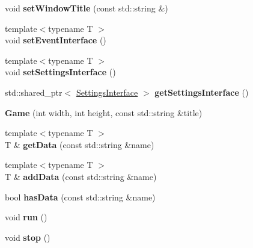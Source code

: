 \begin{DoxyCompactItemize}
void {\bfseries set\+Window\+Title} (const std\+::string \&)
\item 
\mbox{\label{classbkengine_1_1Game_a1480bc58570c9fa4696a642ebe441d7e}} 
{\footnotesize template$<$typename T $>$ }\\void {\bfseries set\+Event\+Interface} ()
\item 
\mbox{\label{classbkengine_1_1Game_a4c86f004e97fe295c87ea2d756cf9793}} 
{\footnotesize template$<$typename T $>$ }\\void {\bfseries set\+Settings\+Interface} ()
\item 
\mbox{\label{classbkengine_1_1Game_a03800577e8e89c0370a6e29d62c5bacf}} 
std\+::shared\+\_\+ptr$<$ \hyperlink{classbkengine_1_1SettingsInterface}{Settings\+Interface} $>$ {\bfseries get\+Settings\+Interface} ()
\item 
\mbox{\label{classbkengine_1_1Game_a91cbdf7dd5a500e2f3fe44cfc5c9b7ba}} 
{\bfseries Game} (int width, int height, const std\+::string \&title)
\item 
\mbox{\label{classbkengine_1_1Game_af69eb7d8cc53c238a87d290841951525}} 
{\footnotesize template$<$typename T $>$ }\\T \& {\bfseries get\+Data} (const std\+::string \&name)
\item 
\mbox{\label{classbkengine_1_1Game_ac9f317fa3194c88239b86a514908bf11}} 
{\footnotesize template$<$typename T $>$ }\\T \& {\bfseries add\+Data} (const std\+::string \&name)
\item 
\mbox{\label{classbkengine_1_1Game_a942d8db592cb45378088f315aef0bc21}} 
bool {\bfseries has\+Data} (const std\+::string \&name)
\item 
\mbox{\label{classbkengine_1_1Game_a1ab78f5ed0d5ea879157357cf2fb2afa}} 
void {\bfseries run} ()
\item 
\mbox{\label{classbkengine_1_1Game_a17fbb36fd4a2085f9ff4f1fa93d7d08b}} 
void {\bfseries stop} ()

\end{DoxyCompactItemize}
